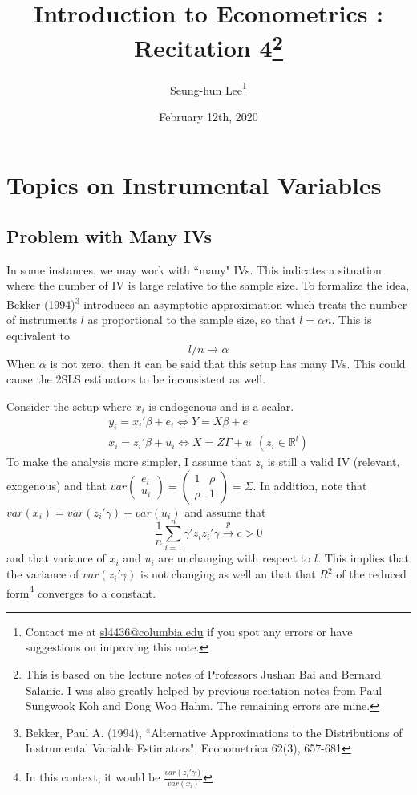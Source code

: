 \documentclass[12pt]{article}
\title{Introduction to Econometrics \ROM{2}: Recitation 4\footnote{This is based on the lecture notes of Professors Jushan Bai and Bernard Salanie. I was also greatly helped by previous recitation notes from Paul Sungwook Koh and Dong Woo Hahm. The remaining errors are mine. }}
\theoremstyle{definition}
\theoremstyle{property}
\theoremstyle{assumption}
\theoremstyle{example}
\theoremstyle{comment}
\begin{document}
\linespread{1.25}
\onehalfspacing

\author{Seung-hun Lee\footnote{Contact me at \href{mailto:sl4436@columbia.edu}{sl4436@columbia.edu} if you spot any errors or have suggestions on improving this note.}}
\date{February 12th, 2020}
\maketitle
\thispagestyle{firstpage}

\section{Topics on Instrumental Variables}
\subsection{Problem with Many IVs}
In some instances, we may work with ``many" IVs. This indicates a situation where the number of IV is large relative to the sample size. To formalize the idea, Bekker (1994)\footnote{Bekker, Paul A. (1994),  ``Alternative Approximations to the Distributions of Instrumental Variable Estimators", Econometrica 62(3), 657-681} introduces an asymptotic approximation which treats the number of instruments $l$ as proportional to the sample size, so that $l=\alpha n$. This is equivalent to 
\[
l/n \to \alpha 
\]
When $\alpha$ is not zero, then it can be said that this setup has many IVs. This could cause the 2SLS estimators to be inconsistent as well. \par
Consider the setup where $x_i$ is endogenous and is a scalar. 
\begin{gather*}
y_ i = x_i'\beta+e_i \iff Y=X\beta+e \\
x_i = z_i'\beta+u_i \iff X=Z\Gamma+u \ \ (z_i \in \mathbb{R}^l)
\end{gather*}
To make the analysis more simpler, I assume that $z_i$ is still a valid IV (relevant, exogenous) and that $var\begin{pmatrix} e_i \\ u_i \end{pmatrix} = \begin{pmatrix}1 & \rho \\ \rho & 1 \end{pmatrix} = \Sigma$. In addition, note that $var(x_i) = var(z_i'\gamma)+var(u_i)$ and assume that
\[
\frac{1}{n}\sum_{i=1}^n \gamma'z_iz_i'\gamma\xrightarrow{p}c>0
\]
and that variance of $x_i$ and $u_i$ are unchanging with respect to $l$. This implies that the variance of $var(z_i'\gamma)$ is not changing as well an that that $R^2$ of the reduced form\footnote{In this context, it would be $\frac{var(z_i'\gamma)}{var(x_i)}$}  converges to a constant. \par
\end{document}

